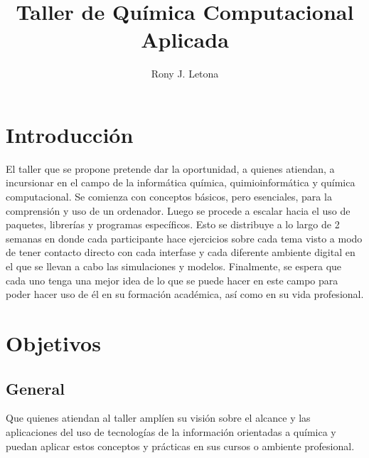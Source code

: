\documentclass[10pt,letterpaper]{article}
\author{Rony J. Letona}
\title{Taller de Qu\'imica Computacional Aplicada}
\begin{document}
\maketitle

\section{Introducci\'on}
El taller que se propone pretende dar la oportunidad, a quienes atiendan, a incursionar en el campo de la inform\'atica qu\'imica, quimioinform\'atica y qu\'imica computacional. Se comienza con conceptos b\'asicos, pero esenciales, para la comprensi\'on y uso de un ordenador. Luego se procede a escalar hacia el uso de paquetes, librer\'ias y programas espec\'ificos. Esto se distribuye a lo largo de 2 semanas en donde cada participante hace ejercicios sobre cada tema visto a modo de tener contacto directo con cada interfase y cada diferente ambiente digital en el que se llevan a cabo las simulaciones y modelos. Finalmente, se espera que cada uno tenga una mejor idea de lo que se puede hacer en este campo para poder hacer uso de \'el en su formaci\'on acad\'emica, as\'i como en su vida profesional.

\section{Objetivos}
\subsection{General}
Que quienes atiendan al taller ampl\'ien su visi\'on sobre el alcance y las aplicaciones del uso de tecnolog\'ias de la informaci\'on orientadas a qu\'imica y puedan aplicar estos conceptos y pr\'acticas en sus cursos o ambiente profesional.
\end{document}
